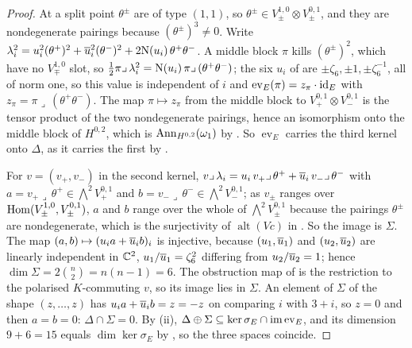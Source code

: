\begin{proof}
At a split point $\theta^{\pm}$ are of type $(1,1)$, so $\theta^{\pm}\in
V_{\pm}^{1,0}\otimes V_{\pm}^{0,1}$, and they are nondegenerate pairings
because $(\theta^{\pm})^{3}\ne0$. Write $\lambda_{i}^{2}=u_{i}^{2}(\theta^{+})^{2}
+\overline{u}_{i}^{2}(\theta^{-})^{2}+2\mathrm{N}(u_{i})\,\theta^{+}\theta^{-}$. A middle
block $\pi$ kills $(\theta^{\pm})^{2}$, which have no $V_{\mp}^{1,0}$ slot, so
$\tfrac12\pi\lrcorner\,\lambda_{i}^{2}=\mathrm{N}(u_{i})\,\pi\lrcorner\,(\theta^{+}\theta^{-})$;
the six $u_{i}$ of  are $\pm\zeta_{6},\pm1,
\pm\zeta_{6}^{-1}$, all of norm one, so this value is independent of $i$ and
$\operatorname{ev}_{E}(\pi)=z_{\pi}\cdot\operatorname{id}_{E}$ with
$z_{\pi}=\pi\lrcorner\,(\theta^{+}\theta^{-})$. The map $\pi\mapsto z_{\pi}$
from the middle block to $V_{+}^{0,1}\otimes V_{-}^{0,1}$ is the tensor
product of the two nondegenerate pairings, hence an isomorphism onto the
middle block of $H^{0,2}$, which is $\operatorname{Ann}_{H^{0,2}}(\omega_{1})$ by
\cite[Lemma~9.6]{paperI}. So $\operatorname{ev}_{E}$ carries the third kernel
onto $\Delta$, as it carries the first by \cite[Theorem~9.19]{paperI}.

For $v=(v_{+},v_{-})$ in the second kernel,
$v\lrcorner\,\lambda_{i}=u_{i}\,v_{+}\lrcorner\,\theta^{+}+\overline{u}_{i}\,
v_{-}\lrcorner\,\theta^{-}$ with $a=v_{+}\lrcorner\,\theta^{+}\in
\bigwedge^{2}V_{+}^{0,1}$ and $b=v_{-}\lrcorner\,\theta^{-}\in\bigwedge^{2}V_{-}^{0,1}$;
as $v_{\pm}$ ranges over $\operatorname{Hom}(V_{\pm}^{1,0},V_{\pm}^{0,1})$, $a$ and $b$
range over the whole of $\bigwedge^{2}V_{\pm}^{0,1}$ because the pairings
$\theta^{\pm}$ are nondegenerate, which is the surjectivity of
$\operatorname{alt}(Vc)$ in \cite[(26)]{paperI}. So the image is $\Sigma$.
The map $(a,b)\mapsto(u_{i}a+\overline{u}_{i}b)_{i}$ is injective, because
$(u_{1},\overline{u}_{1})$ and $(u_{2},\overline{u}_{2})$ are linearly independent in
$\mathbb{C}^{2}$, $u_{1}/\overline{u}_{1}=\zeta_{6}^{2}$ differing from
$u_{2}/\overline{u}_{2}=1$; hence $\dim\Sigma=2\binom{n}{2}=n(n-1)=6$. The
obstruction map of  is the restriction to the
polarised $K$-commuting $v$, so its image lies in $\Sigma$. An element of
$\Sigma$ of the shape $(z,\dots,z)$ has $u_{i}a+\overline{u}_{i}b=z=-z$ on
comparing $i$ with $3+i$, so $z=0$ and then $a=b=0$: $\Delta\cap\Sigma=0$.
By (ii), $\Delta\oplus\Sigma\subseteq\ker\sigma_{E}\cap\operatorname{im}\operatorname{ev}_{E}$,
and its dimension $9+6=15$ equals $\dim\ker\sigma_{E}$ by
, so the three spaces coincide.


\end{proof}
